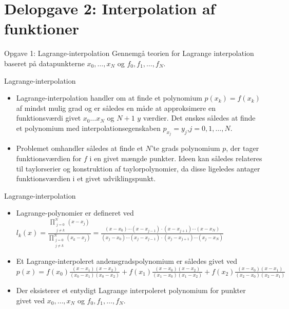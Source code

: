 \section{Delopgave 2: Interpolation af funktioner}
\begin{frame}{Opgave 1: Lagrange-interpolation}
    Gennemgå teorien for Lagrange interpolation baseret på datapunkterne $x_0, \ldots, x_N$ og $f_0, f_1, \ldots , f_N$. 
\end{frame}

\begin{frame}{Lagrange-interpolation}
    \begin{itemize}
        \item Lagrange-interpolation handler om at finde et polynomium $p(x_k)=f(x_k)$ af mindst mulig grad og er således en måde at approksimere en funktionsværdi givet $x_0 \ldots x_N$ og $N+1 $  $y$ værdier.
        Det ønskes således at finde et polynomium med interpolationsegenskaben $p_{x_j}=y_j$,$j=0,1,\ldots,N$.

        \item Problemet omhandler således at finde et $N$'te grads polynomium $p$, der tager funktionsværdien for $f$ i en givet mængde punkter. 
        Ideen kan således relateres til taylorserier og konstruktion af taylorpolynomier, da disse ligeledes antager funktionsværdien i et givet udviklingspunkt.
    \end{itemize}
\end{frame}
\begin{frame}{Lagrange-interpolation}
    \begin{itemize}
        \item Lagrange-polynomier er defineret ved \\
            $
            l_k(x)=\frac{\prod_{\substack{j=0 \\ {j \neq k}}}^{N}(x-x_j)}{\prod_{\substack{j=0 \\ {j \neq k}}}^{N}(x_k-x_j)}=\frac{(x-x_0) \cdots (x-x_{j-1}) \cdot (x-x_{j+1})\cdots(x-x_N)}{(x_j-x_0)\cdots (x_j-x_{j-1}) \cdot (x_j-x_{j+1})\cdots (x_j - x_N)}
            $
        \item Et Lagrange-interpoleret andensgradspolynomium er således givet ved $ p(x)=f(x_0)\frac{(x-x_1)(x-x_2)}{(x_0-x_1)(x_0-x_2)}+f(x_1)\frac{(x-x_0)(x-x_2)}{(x_1-x_0)(x_1-x_2)}+f(x_2)\frac{(x-x_0)(x-x_1)}{(x_2-x_0)(x_2-x_1)} $
        \item Der eksisterer et entydigt Lagrange interpoleret polynomium for punkter givet ved $x_0, \ldots, x_N$ og $f_0, f_1, \ldots , f_N$.
        
    \end{itemize}
\end{frame}
